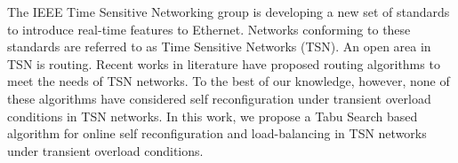 The IEEE Time Sensitive Networking group is developing a new set of standards to introduce real-time features to Ethernet. Networks conforming to these standards are referred to as Time Sensitive Networks (TSN). An open area in TSN is routing. Recent works in literature have proposed routing algorithms to meet the needs of TSN networks. To the best of our knowledge, however, none of these algorithms have considered self reconfiguration under transient overload conditions in TSN networks. In this work, we propose a Tabu Search based algorithm for online self reconfiguration and load-balancing in TSN networks under transient overload conditions. 